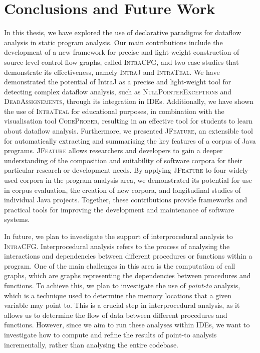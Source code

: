 \section{Conclusions and Future Work}%
\label{sec:kappa:conclusions}%
In this thesis, we have explored the use of declarative paradigms for
dataflow analysis in static program analysis. Our main contributions include the
development of a new framework for precise and light-weight construction of source-level
control-flow graphs, called \textsc{IntraCFG}, and two case studies that demonstrate
its effectiveness, namely \textsc{IntraJ} and \textsc{IntraTeal}.
We have demonstrated the potential of IntraJ as a precise and light-weight tool
for detecting complex dataflow analysis, such as \textsc{NullPointerExceptions} and \textsc{DeadAssignements},
through its integration in IDEs. Additionally, we have shown the use of \textsc{IntraTeal}
for educational purposes, in combination with the visualisation tool \textsc{CodeProber},
resulting in an effective tool for students to learn about dataflow analysis.
Furthermore, we presented  \textsc{JFeature}, an extensible tool for automatically
extracting and summarising the key features of a corpus of Java programs.
\textsc{JFeature} allows researchers and developers to gain a deeper understanding of the composition and
suitability of software corpora for their particular research or development needs.
By applying \textsc{JFeature} to four widely-used corpora in the program analysis area,
we demonstrated its potential for use in corpus evaluation, the creation of new
corpora, and longitudinal studies of individual Java projects.
Together, these contributions provide frameworks and practical tools
for improving the development and maintenance of software systems.


In future, we plan to investigate the support of interprocedural analysis
to \textsc{IntraCFG}. Interprocedural analysis refers to the process of analysing
the interactions and dependencies between different procedures or functions within a
program. One of the main challenges in this area is the computation of call graphs,
which are graphs representing the dependencies between procedures and functions.
To achieve this, we plan to investigate the use of \emph{point-to} analysis, which is a
technique used to determine the memory locations that a given variable may point to.
This is a crucial step in interprocedural analysis, as it allows us to determine
the flow of data between different procedures and functions. However, since we aim
to run these analyses within IDEs, we want to investigate how to compute and refine
the results of point-to analysis incrementally, rather than analysing the entire codebase.

